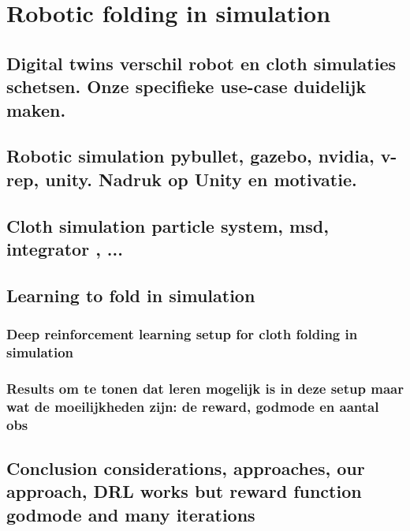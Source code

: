\documentclass[\home/main.tex]{subfiles}
\begin{document}
\chapter{Robotic folding in simulation}\label{ch:simulation}
\section{Digital twins {\tiny verschil robot en cloth simulaties schetsen. Onze specifieke use-case duidelijk maken. }}
\section{Robotic simulation {\tiny pybullet, gazebo, nvidia, v-rep, unity. Nadruk op Unity en motivatie.}}
\section{Cloth simulation \tiny{particle system, msd, integrator , ...} }

\section{Learning to fold in simulation}
\subsection{Deep reinforcement learning setup for cloth folding in simulation}
\subsection{Results \tiny{om te tonen dat leren mogelijk is in deze setup maar wat de moeilijkheden zijn: de reward, godmode en aantal obs}}
\section{Conclusion {\tiny considerations, approaches, our approach, DRL works but reward function godmode and many iterations}}
\end{document}
